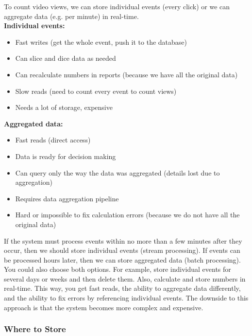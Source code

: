 \documentclass[12pt, titlepage]{article}
\begin{document}
To count video views, we can store individual events (every click) or we can aggregate data (e.g. per minute) in real-time. \\

\textbf{Individual events:}
\begin{itemize}
  \item Fast writes (get the whole event, push it to the database)
  \item Can slice and dice data as needed
  \item Can recalculate numbers in reports (because we have all the original data)
  \item Slow reads (need to count every event to count views)
  \item Needs a lot of storage, expensive \\
\end{itemize}

\textbf{Aggregated data:}
\begin{itemize}
  \item Fast reads (direct access)
  \item Data is ready for decision making
  \item Can query only the way the data was aggregated (details lost due to aggregation)
  \item Requires data aggregation pipeline
  \item Hard or impossible to fix calculation errors (because we do not have all the original data)
\end{itemize}

If the system must process events within no more than a few minutes after they occur, then we should store individual events (stream processing). If events can be processed hours later, then we can store aggregated data (batch processing). \\

You could also choose both options. For example, store individual events for several days or weeks and then delete them. Also, calculate and store numbers in real-time. This way, you get fast reads, the ability to aggregate data differently, and the ability to fix errors by referencing individual events. The downside to this approach is that the system becomes more complex and expensive.

\subsubsection{Where to Store}
\end{document}
